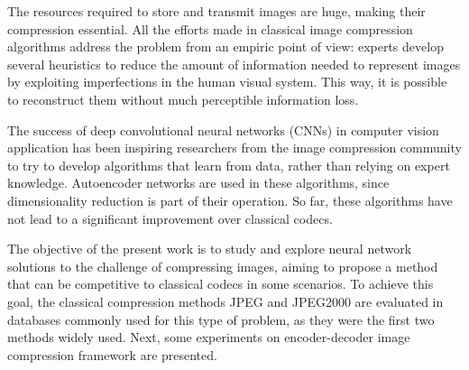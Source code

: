 The resources required to store and transmit images are huge, making their compression essential. All the efforts made in classical image compression algorithms address the problem from an empiric point of view: experts develop several heuristics to reduce the amount of information needed to represent images by exploiting imperfections in the human visual system. This way, it is possible to reconstruct them without much perceptible information loss.

The success of deep convolutional neural networks (CNNs) in computer vision application has been inspiring researchers from the image compression community to try to develop algorithms that learn from data, rather than relying on expert knowledge. Autoencoder networks are used in these algorithms, since dimensionality reduction is part of their operation. So far, these algorithms have not lead to a significant improvement over classical codecs.

The objective of the present work is to study and explore neural network solutions to the challenge of compressing images, aiming to propose a method that can be competitive to classical codecs in some scenarios. To achieve this goal, the classical compression methods JPEG and JPEG2000 are evaluated in databases commonly used for this type of problem, as they were the first two methods widely used. Next, some experiments on encoder-decoder image compression framework are presented.